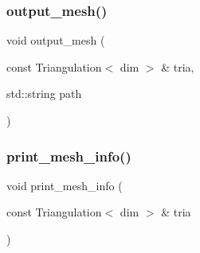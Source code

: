 \mbox{\label{group___supplementary_ga0272b346b175b931e89b017fd93b5b80}} 
\subsubsection{\texorpdfstring{output\+\_\+mesh()}{output\_mesh()}}
{\footnotesize\ttfamily void output\+\_\+mesh (\begin{DoxyParamCaption}\item[{const Triangulation$<$ dim $>$ \&}]{tria,  }\item[{std\+::string}]{path }\end{DoxyParamCaption})}

\mbox{\label{group___supplementary_ga2971a293263dddc17f3df81add2ffbbe}} 
\subsubsection{\texorpdfstring{print\+\_\+mesh\+\_\+info()}{print\_mesh\_info()}}
{\footnotesize\ttfamily void print\+\_\+mesh\+\_\+info (\begin{DoxyParamCaption}\item[{const Triangulation$<$ dim $>$ \&}]{tria }\end{DoxyParamCaption})}

